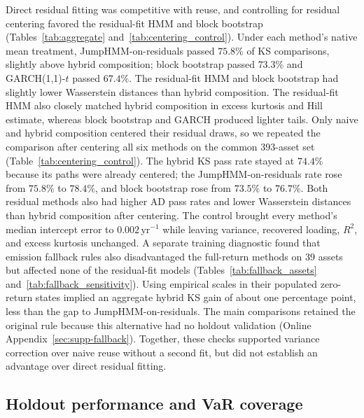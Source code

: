 Direct residual fitting was competitive with reuse, and controlling
for residual centering favored the residual-fit HMM and block
bootstrap (Tables~\ref{tab:aggregate}
and~\ref{tab:centering_control}). Under each method's native mean
treatment, JumpHMM-on-residuals passed $75.8\%$ of KS comparisons,
slightly above hybrid composition; block bootstrap passed $73.3\%$
and GARCH(1,1)-$t$ passed $67.4\%$. The residual-fit HMM and block
bootstrap had slightly lower Wasserstein distances than hybrid
composition. The residual-fit HMM also closely matched hybrid composition
in excess kurtosis and Hill estimate, whereas block bootstrap and GARCH
produced lighter tails. Only naive and hybrid composition centered
their residual draws, so we repeated the comparison after centering
all six methods on the common $393$-asset set
(Table~\ref{tab:centering_control}). The hybrid KS pass rate stayed
at $74.4\%$ because its paths were already centered; the
JumpHMM-on-residuals rate rose from $75.8\%$ to $78.4\%$, and block
bootstrap rose from $73.5\%$ to $76.7\%$. Both residual methods
also had higher AD pass rates and lower Wasserstein distances than
hybrid composition after centering. The control brought every
method's median intercept error to $0.002\,\mathrm{yr}^{-1}$ while
leaving variance, recovered loading, $R^2$, and excess kurtosis
unchanged. A separate training diagnostic found that emission fallback rules
also disadvantaged the full-return methods on $39$ assets but affected
none of the residual-fit models (Tables~\ref{tab:fallback_assets}
and~\ref{tab:fallback_sensitivity}). Using empirical scales in their
populated zero-return states implied an aggregate hybrid KS gain of
about one percentage point, less than the gap to JumpHMM-on-residuals.
The main comparisons retained the original rule because this
alternative had no holdout validation (Online
Appendix~\ref{sec:supp-fallback}). Together, these
checks supported variance correction over naive reuse without a
second fit, but did not establish an advantage over direct residual
fitting.

\subsection{Holdout performance and VaR coverage}

